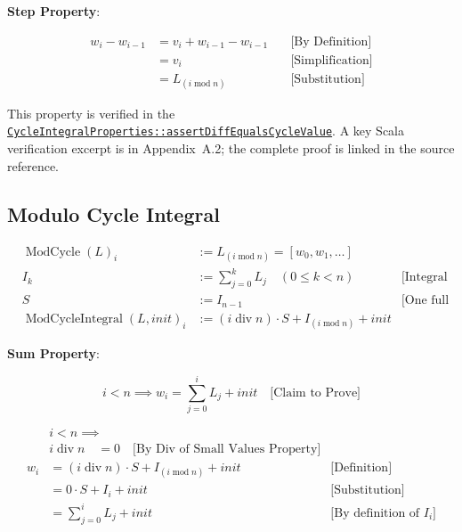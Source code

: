 \textbf{Step Property}:

\begin{equation*}
\begin{aligned}
w_i - w_{i-1} &= v_i + w_{i-1} - w_{i-1} \quad &\text{[By Definition]} \\
&= v_i \quad &\text{[Simplification]} \\
&= L_{(i \operatorname{mod} n)} \quad &\text{[Substitution]}
\end{aligned}
\end{equation*}

{\raggedright
This property is verified in the
\href{https://github.com/thiagomata/prime-numbers/blob/integral-cycle-article-v1.0.0/src/main/scala/v1/chapter4/cycle/integral/recursive/properties/CycleIntegralProperties.scala}{\texttt{CycleIntegralProperties::\allowbreak assertDiffEqualsCycleValue}}.
A key Scala verification excerpt is in Appendix~A.2; the complete proof is
linked in the source reference.\par}

\subsection{Modulo Cycle Integral}

\begin{equation*}
\begin{aligned}
&\operatorname{ModCycle}(L)_i &:= L_{(i \operatorname{mod} n)} = [w_0, w_1, \dots ] \\
&I_k &:= \sum_{j=0}^{k} L_j \quad (0 \leq k < n) \quad &\text{[Integral of L]} \\
&S &:= I_{n-1} \quad &\text{[One full cycle sum]} \\
&\operatorname{ModCycleIntegral}(L, init)_i &:= (i \operatorname{div} n)\cdot S + I_{(i \operatorname{mod} n)} + init
\end{aligned}
\end{equation*}

\textbf{Sum Property}:

\begin{equation*}
i < n \implies w_i = \sum_{j=0}^i L_j + init \quad \text{[Claim to Prove]}
\end{equation*}

\begin{equation*}
\begin{aligned}
& i < n \implies  \\
& i \operatorname{div} n
      \quad = 0 \quad
      \text{[By Div of Small Values Property]} \\
w_i &= (i \operatorname{div} n)\cdot S + I_{(i \operatorname{mod} n)} + init \quad
      &\text{[Definition]} \\
&= 0 \cdot S + I_i + init \quad &\text{[Substitution]} \\
&= \sum_{j=0}^i L_j + init \quad &\text{[By definition of } I_i]
\end{aligned}
\end{equation*}

